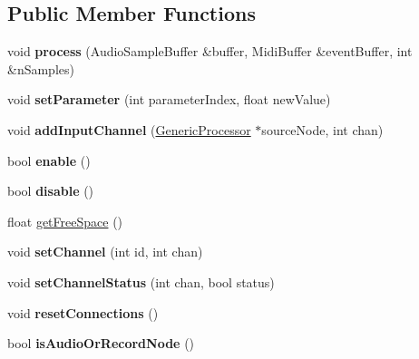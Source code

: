 \subsection*{Public Member Functions}
\begin{DoxyCompactItemize}
\item 
\hypertarget{classRecordNode_aca58ffeeeb9a112bfe4a8275d3e8e3ba}{void {\bfseries process} (Audio\-Sample\-Buffer \&buffer, Midi\-Buffer \&event\-Buffer, int \&n\-Samples)}\label{classRecordNode_aca58ffeeeb9a112bfe4a8275d3e8e3ba}

\item 
\hypertarget{classRecordNode_a8a63274afcbea876bb3d83b47ca40c2f}{void {\bfseries set\-Parameter} (int parameter\-Index, float new\-Value)}\label{classRecordNode_a8a63274afcbea876bb3d83b47ca40c2f}

\item 
\hypertarget{classRecordNode_a4047f96e619200aeaf00795e70c7cef6}{void {\bfseries add\-Input\-Channel} (\hyperlink{classGenericProcessor}{Generic\-Processor} $\ast$source\-Node, int chan)}\label{classRecordNode_a4047f96e619200aeaf00795e70c7cef6}

\item 
\hypertarget{classRecordNode_a9b4fa6a3b6662d9888184dd3ad013872}{bool {\bfseries enable} ()}\label{classRecordNode_a9b4fa6a3b6662d9888184dd3ad013872}

\item 
\hypertarget{classRecordNode_ae020d2f723fb1468f48f14d76d007202}{bool {\bfseries disable} ()}\label{classRecordNode_ae020d2f723fb1468f48f14d76d007202}

\item 
float \hyperlink{classRecordNode_a208709d4b0f959a845f10490acde9ca8}{get\-Free\-Space} ()
\item 
\hypertarget{classRecordNode_a7fd11ada72f04467e0dc8fc9a55fba42}{void {\bfseries set\-Channel} (int id, int chan)}\label{classRecordNode_a7fd11ada72f04467e0dc8fc9a55fba42}

\item 
\hypertarget{classRecordNode_afe6506668d8072656c54a843abde276d}{void {\bfseries set\-Channel\-Status} (int chan, bool status)}\label{classRecordNode_afe6506668d8072656c54a843abde276d}

\item 
\hypertarget{classRecordNode_aaa35ce70d9da415b021a426e8cd43765}{void {\bfseries reset\-Connections} ()}\label{classRecordNode_aaa35ce70d9da415b021a426e8cd43765}

\item 
\hypertarget{classRecordNode_a65b8be30adce613a4f4e0acf684b787c}{bool {\bfseries is\-Audio\-Or\-Record\-Node} ()}\label{classRecordNode_a65b8be30adce613a4f4e0acf684b787c}


\end{DoxyCompactItemize}
